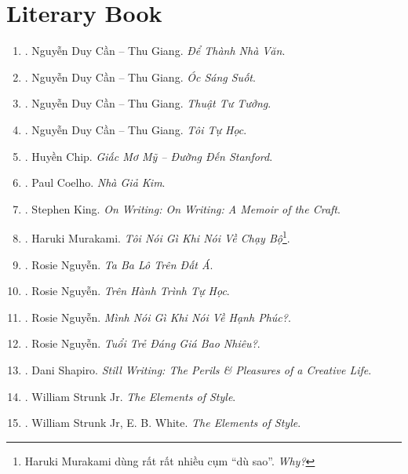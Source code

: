 \documentclass{article}
\begin{document}

\section{Literary Book}

\begin{enumerate}
	\item \cite{Can_dtnv}. Nguyễn Duy Cần -- Thu Giang. \textit{Để Thành Nhà Văn}.\hfill{}
	\item \cite{Can_oss}. Nguyễn Duy Cần -- Thu Giang. \textit{Óc Sáng Suốt}.\hfill{}
	\item \cite{Can_ttt}. Nguyễn Duy Cần -- Thu Giang. \textit{Thuật Tư Tưởng}.\hfill{}
	\item \cite{Can_tth}. Nguyễn Duy Cần -- Thu Giang. \textit{Tôi Tự Học}.\hfill{}
	\item \cite{Chip2018}. Huyền Chip. \textit{Giấc Mơ Mỹ -- Đường Đến Stanford}.\hfill{}
	\item \cite{Coelho2023}. Paul Coelho. \textit{Nhà Giả Kim}.\hfill{}
	\item \cite{King2000, King2010}. Stephen King. \textit{On Writing: On Writing: A Memoir of the Craft}.\hfill{\sf[downloaded]}
	\item \cite{Murakami2023}. Haruki Murakami. \textit{Tôi Nói Gì Khi Nói Về Chạy Bộ}\footnote{Haruki Murakami dùng rất rất nhiều cụm ``dù sao''. \textit{Why?}}.\hfill{}
	\item \cite{Rosie2021a}. Rosie Nguyễn. \textit{Ta Ba Lô Trên Đất Á}.\hfill{\sf[bought]}
	\item \cite{Rosie2021b}. Rosie Nguyễn. \textit{Trên Hành Trình Tự Học}.\hfill{}
	\item \cite{Rosie2022a}. Rosie Nguyễn. \textit{Mình Nói Gì Khi Nói Về Hạnh Phúc?}.\hfill{}
	\item \cite{Rosie2022b}. Rosie Nguyễn. \textit{Tuổi Trẻ Đáng Giá Bao Nhiêu?}.\hfill{}
	\item \cite{Shapiro2014}. Dani Shapiro. \textit{Still Writing: The Perils \& Pleasures of a Creative Life}.\hfill{\sf[downloaded]}
	\item \cite{Strunk1918}. William Strunk Jr. \textit{The Elements of Style}.\hfill{}
	\item \cite{Strunk_White2019}. William Strunk Jr, E. B. White. \textit{The Elements of Style}.\hfill{}

\end{enumerate}
\end{document}
